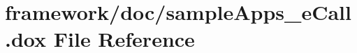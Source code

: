 \hypertarget{sample_apps__e_call_8dox}{}\section{framework/doc/sample\+Apps\+\_\+e\+Call.dox File Reference}
\label{sample_apps__e_call_8dox}
